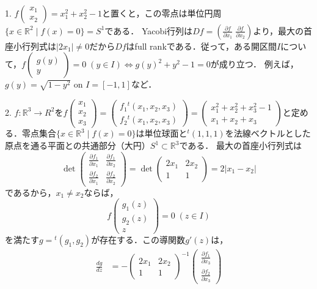 \documentclass[uplatex, dvipdfmx]{jsreport}
\begin{document}
\begin{example}　

    1. $f\begin{pmatrix}x_1\\x_2\end{pmatrix}=x_1^2+x_2^2-1$と置くと，この零点は単位円周$\{x\in\mathbb{R}^2\mid f(x)=0\}=S^1$である．
    Yacobi行列は$Df=\left(\frac{\partial f}{\partial x_1}\;\frac{\partial f}{\partial x_2}\right)$より，最大の首座小行列式は$|2x_1|\ne 0$だから$Df$はfull rankである．従って，ある開区間$I$について，$f\begin{pmatrix}g(y)\\y\end{pmatrix}=0\;(y\in I)\Leftrightarrow g(y)^2+y^2-1=0$が成り立つ．
    例えば，$g(y)=\sqrt{1-y^2}$ on $I=[-1,1]$など．

    2. $f:\mathbb{R}^3\to R^2$を$f\begin{pmatrix}x_1\\x_2\\x_3\end{pmatrix}=\begin{pmatrix}f_1{}^t(x_1,x_2,x_3)\\f_2{}^t(x_1,x_2,x_3)\end{pmatrix}=\begin{pmatrix}x_1^2+x_2^2+x_3^2-1\\x_1+x_2+x_3\end{pmatrix}$と定める．零点集合$\{x\in\mathbb{R}^3\mid f(x)=0\}$は単位球面と${}^t(1,1,1)$を法線ベクトルとした原点を通る平面との共通部分（大円）$S^1\subset\mathbb{R}^3$である．
    最大の首座小行列式は
    \[\det\begin{pmatrix}\frac{\partial f_1}{\partial x_1}&\frac{\partial f_1}{\partial x_2}\\\frac{\partial f_2}{\partial x_1}&\frac{\partial f_2}{\partial x_2}\end{pmatrix}=\det\begin{pmatrix}2x_1&2x_2\\1&1\end{pmatrix}=2|x_1-x_2|\]
    であるから，$x_1\ne x_2$ならば，
    \[ f\begin{pmatrix}g_1(z)\\g_2(z)\\z\end{pmatrix}=0\;(z\in I) \]
    を満たす$g={}^t(g_1,g_2)$が存在する．この導関数$g'(z)$は，
    \begin{align*}
        \frac{dg}{dz} &= -\begin{pmatrix}2x_1&2x_2\\1&1\end{pmatrix}^{-1}\begin{pmatrix}\frac{\partial f_1}{\partial x_3}\\\frac{\partial f_2}{\partial x_3}\end{pmatrix}\\

\end{align*}
\end{example}
\end{document}
